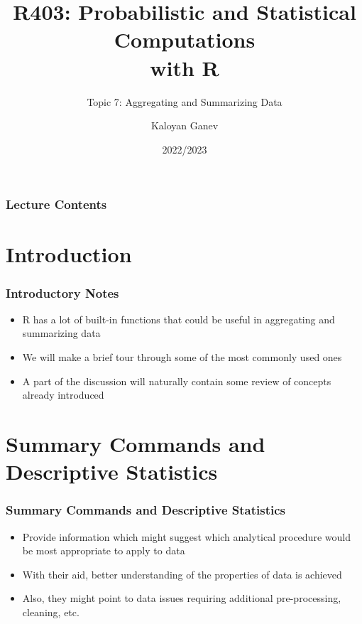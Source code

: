 \documentclass[10pt]{beamer}
\title{R403: Probabilistic and Statistical Computations\\ with R}
\subtitle{Topic 7: \textcolor{myred}{Aggregating and Summarizing Data}}
\author{Kaloyan Ganev}
\date{2022/2023}
\theoremstyle{definition}
\begin{document}
\maketitle
	
\begin{frame}[fragile]
\frametitle{Lecture Contents}
	\tableofcontents
\end{frame}

\section{Introduction}
\begin{frame}[fragile]
\frametitle{Introductory Notes}
\begin{itemize}
	\item R has a lot of built-in functions that could be useful in aggregating and summarizing data
	
	\item We will make a brief tour through some of the most commonly used ones
	
	\item A part of the discussion will naturally contain some review of concepts already introduced
\end{itemize}
\end{frame}

\section{Summary Commands and Descriptive
Statistics}\label{summary-commands-and-descriptive-statistics}

\begin{frame}[fragile]
\frametitle{Summary Commands and Descriptive Statistics}
\begin{itemize}
	\item Provide information which might suggest which analytical procedure would be most appropriate to apply to data
	
	\item With their aid, better understanding of the properties of data is achieved
	
	\item Also, they might point to data issues requiring additional pre-processing, cleaning, etc.
\end{itemize}
\end{frame}
\end{document}
